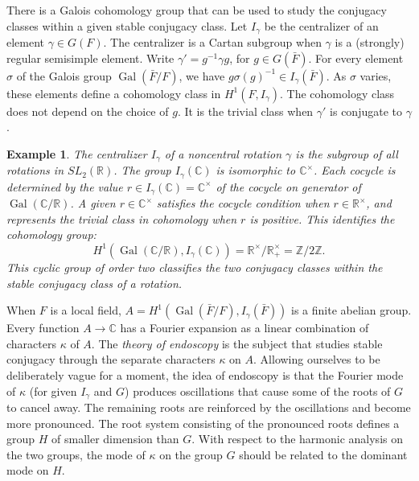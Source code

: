 \documentclass[brochure,english,12pt]{bourbaki}
\newtheorem{example}[equation]{Example}
\def\op#1{{\operatorname{#1}}}
\newcommand{\ring}[1]{\mathbb{#1}}
\begin{document}
There is a Galois cohomology group that can be used to study the conjugacy classes within
a given stable conjugacy class.  Let $I_\gamma$ be the centralizer of an element $\gamma\in G(F)$.
The centralizer is a Cartan subgroup when $\gamma$ is a (strongly) regular semisimple element.
Write $\gamma'=g^{-1}\gamma g$, for $g\in G(\bar F)$.
For every element $\sigma$ of the Galois group $\op{Gal}(\bar F/F)$,  we have
 $g\sigma(g)^{-1}\in I_\gamma(\bar F)$.  As $\sigma$ varies, these elements define a cohomology class in
$H^1(F,I_\gamma)$.  The cohomology class does not depend
on the choice of $g$.  It is the trivial class when
$\gamma'$ is conjugate to $\gamma$.


\begin{example} The centralizer $I_\gamma$ of a noncentral rotation $\gamma$ is  the subgroup of all
rotations in  $SL_2(\ring{R})$.  The group $I_\gamma(\ring{C})$ is isomorphic
  to $\ring{C}^\times$.   Each cocycle is determined by the value $r\in I_\gamma(\ring{C})=\ring{C}^\times$ 
   of the cocycle on generator of  $\op{Gal}(\ring{C}/\ring{R})$.  A given $r\in\ring{C}^\times$
satisfies the cocycle condition when $r\in \ring{R}^\times$,
  and represents the trivial class in cohomology when $r$ is positive.  This identifies the cohomology group:
\[
H^1(\op{Gal}(\ring{C}/\ring{R}),I_\gamma(\ring{C})) = \ring{R}^\times/\ring{R}^\times_+ = \ring{Z}/2\ring{Z}.
\]
 This cyclic group of order two classifies the two conjugacy classes within the stable conjugacy class
 of a rotation.
\end{example}

When $F$ is a local field, $A=H^1(\op{Gal}(\bar F/F),I_\gamma(\bar F))$ is a
finite abelian group.  Every function $A\to\ring{C}$  has a
Fourier expansion as a linear combination of characters $\kappa$ of
$A$.  
The {\it theory of endoscopy} is the subject that studies stable
conjugacy through the separate characters $\kappa$ on $A$.  Allowing
ourselves to be deliberately vague for a moment, the idea of endoscopy
is that the Fourier mode of $\kappa$ (for given $I_\gamma$ and $G$)
produces oscillations that cause some of the roots of $G$ to cancel
away.  The remaining roots are reinforced by the oscillations and
become more pronounced.  The root system consisting of the pronounced
roots defines a group $H$ of smaller dimension than $G$.  With respect
to the harmonic analysis on the two groups, the mode of $\kappa$ on
the group $G$ should be related to the dominant mode on $H$.
\end{document}
